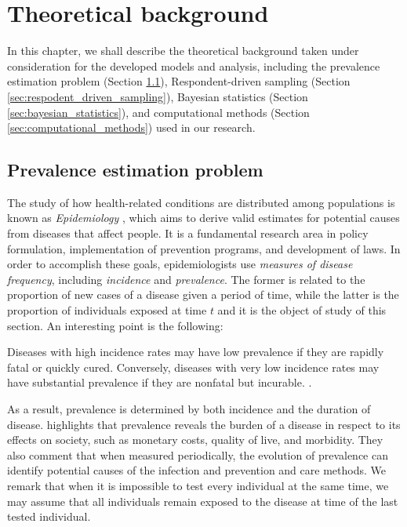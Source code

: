 \chapter{Theoretical background}
\label{ch:theoretical-background}

In this chapter, we shall describe the theoretical background
taken under consideration for the developed models and analysis, including
the prevalence estimation problem (Section
\ref{sec:prevalence_estimation_problem}), Respondent-driven sampling (Section
\ref{sec:respodent_driven_sampling}), Bayesian statistics (Section
\ref{sec:bayesian_statistics}), and computational methods (Section
\ref{sec:computational_methods}) used in our research.

\section{Prevalence estimation problem}
\label{sec:prevalence_estimation_problem}

The study of how health-related conditions are distributed among populations
is known as {\em Epidemiology} \cite[p. 32]{rothman2008modern}, which aims to derive valid estimates for
potential causes from diseases that affect people. It is a fundamental
research area in policy formulation, implementation of prevention programs,
and development of laws. In order to accomplish these goals,
epidemiologists use {\em measures of disease frequency}, including {\em
incidence} and {\em prevalence}. The former is related to the proportion of
new cases of a disease given a period of time, while the latter is the proportion
of individuals exposed at time $t$ and it is the object of
study of this section. An interesting point is the following:

\begin{citacao}
  Diseases with high incidence rates may have low prevalence if they are rapidly fatal or quickly cured. Conversely, diseases with very low incidence
  rates may have substantial prevalence if they are nonfatal but incurable.
  \cite[p. 46]{rothman2008modern}.
\end{citacao}

As a result, prevalence is determined by both incidence and the duration of disease. \textcite[p. c18]{noordzij2010measures} highlights that
prevalence reveals the burden of a disease in respect to its effects on
society, such as monetary costs, quality of live, and morbidity. They also
comment that when measured periodically, the evolution of prevalence can identify potential
causes of the infection and prevention and care methods. We remark that when it is impossible to test every individual at the same
time, we may assume that all individuals remain exposed to the disease at time of
the last tested individual.

